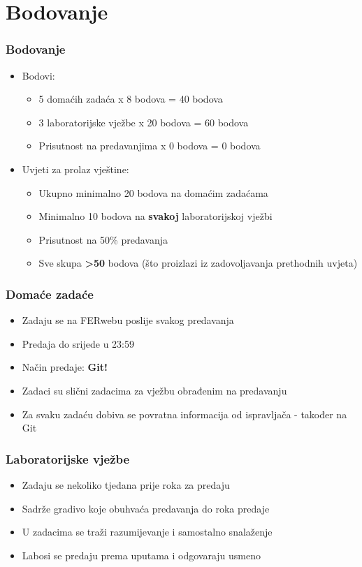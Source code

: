 \documentclass{beamer}
\begin{document}
\section{Bodovanje}
\begin{frame}[t]
\frametitle{Bodovanje}
\begin{itemize}
	\item Bodovi:
	\begin{itemize}
		\item 5 domaćih zadaća x 8 bodova = 40 bodova
		\item 3 laboratorijske vježbe x 20 bodova = 60 bodova
		\item Prisutnost na predavanjima x 0 bodova = 0 bodova
	\end{itemize}
	\item Uvjeti za prolaz vještine:
	\begin{itemize}
		\item Ukupno minimalno 20 bodova na domaćim zadaćama
		\item Minimalno 10 bodova na \textbf{svakoj} laboratorijskoj vježbi
		\item Prisutnost na 50\% predavanja
		\item Sve skupa \textbf{\textgreater 50} bodova (što proizlazi iz zadovoljavanja prethodnih uvjeta)
	\end{itemize}
\end{itemize}
\end{frame}

\begin{frame}[t]
\frametitle{Domaće zadaće}
\begin{itemize}
	\item Zadaju se na FERwebu poslije svakog predavanja
	\item Predaja do srijede u 23:59
	\item Način predaje: \textbf{Git!}
	\item Zadaci su slični zadacima za vježbu obrađenim na predavanju
	\item Za svaku zadaću dobiva se povratna informacija od ispravljača - također na Git
\end{itemize}
\end{frame}

\begin{frame}[t]
\frametitle{Laboratorijske vježbe}
\begin{itemize}
	\item Zadaju se nekoliko tjedana prije roka za predaju
	\item Sadrže gradivo koje obuhvaća predavanja do roka predaje
	\item U zadacima se traži razumijevanje i samostalno snalaženje
	\item Labosi se predaju prema uputama i odgovaraju usmeno
\end{itemize}
\end{frame}
\end{document}
